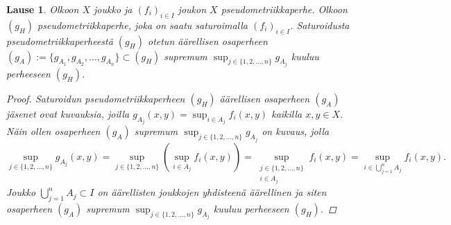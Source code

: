 \documentclass[12pt,a4paper,leqno]{report}
\theoremstyle{plain}
\newtheorem{lause}[equation]{Lause}
\theoremstyle{definition}
\theoremstyle{remark}
\begin{document}
\begin{lause}\label{saturoitu lause}
Olkoon $X$ joukko ja $(f_i)_{i\in I} $ joukon $X$ pseudometriikkaperhe. 
Olkoon $(g_{H})$ pseudometriikkaperhe, joka on saatu saturoimalla $(f_{i})_{i\in I}$. 
Saturoidusta pseudometriikkaperheestä $(g_{H})$ otetun 
äärellisen osaperheen 
$(g_A):=\{g_{A_1},g_{A_2},\dots,g_{A_n}\}\subset (g_{H})$ supremum 
$\sup_{j\in \{1,2,\dots , n\}}g_{A_j}$ 
kuuluu perheeseen $(g_H)$. 
\begin{proof}
Saturoidun pseudometriikkaperheen $(g_{H})$ 
äärellisen osaperheen 
$(g_A)$ jäsenet ovat kuvauksia, joilla 
$g_{A_j}(x,y)=\sup_{i\in A_j}f_i(x,y)$ kaikilla $x,y\in X$.
Näin ollen osaperheen 
$(g_A)$ supremum 
$\sup_{j\in \{1,2,\dots , n\}}g_{A_j}$ on kuvaus, 
jolla 
$$\sup_{j\in \{1,2,\dots , n\}}g_{A_j}(x,y)
=\sup_{j\in \{1,2,\dots , n\}}\left(\sup_{i\in A_j}f_i(x,y)\right)
=\sup_{\substack{j\in \{1,2,\dots , n\}\\i\in A_j}}f_i(x,y)
=\sup_{i\in \bigcup_{j=1}^n A_j}f_i(x,y)
.$$ 
Joukko $\bigcup_{j=1}^n A_j\subset I$ on äärellisten joukkojen 
yhdisteenä äärellinen ja siten 
osaperheen 
$(g_A)$ supremum $\sup_{j\in \{1,2,\dots , n\}}g_{A_j}$ kuuluu perheeseen $(g_H)$.
\end{proof}
\end{lause}
\end{document}
